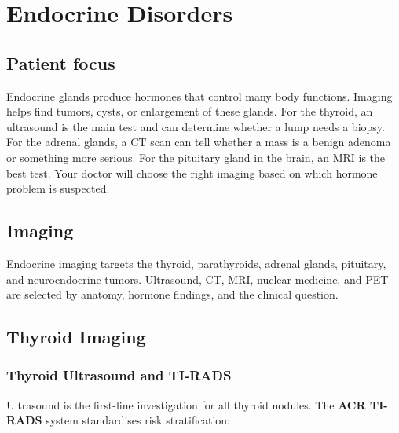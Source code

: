 \chapter{Endocrine Disorders}

\section*{Patient focus}
Endocrine glands produce hormones that control many body functions. Imaging helps find tumors, cysts, or enlargement of these glands. For the thyroid, an ultrasound is the main test and can determine whether a lump needs a biopsy. For the adrenal glands, a CT scan can tell whether a mass is a benign adenoma or something more serious. For the pituitary gland in the brain, an MRI is the best test. Your doctor will choose the right imaging based on which hormone problem is suspected.


\label{ch:ch66_endocrine_disorders}

\section{Imaging}
Endocrine imaging targets the thyroid, parathyroids, adrenal glands, pituitary, and neuroendocrine tumors. Ultrasound, CT, MRI, nuclear medicine, and PET are selected by anatomy, hormone findings, and the clinical question.

\section{Thyroid Imaging}

\subsection{Thyroid Ultrasound and TI-RADS}
Ultrasound is the first-line investigation for all thyroid nodules. The \textbf{ACR TI-RADS} system standardises risk stratification:

